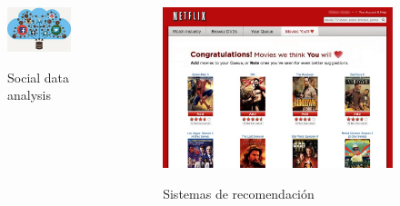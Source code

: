 {\begin{frame}{}
\begin{columns}[c]
			\begin{figure}[H]
				\centering
				\includegraphics[width=\textwidth]{./Images/social.jpg}
				
				\small Social data analysis
			\end{figure}
			
			\begin{figure}[H]
				\centering
				\includegraphics[width=\textwidth]{./Images/recommendations.jpg}
				
				\small Sistemas de recomendación
			\end{figure}			
		\end{columns}

		
	\end{frame}
}